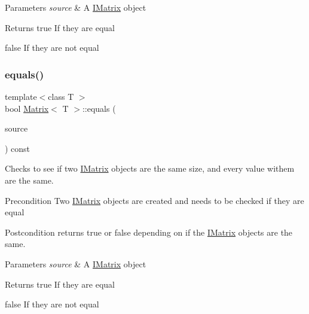 \begin{DoxyParams}{Parameters}
{\em source} & A \mbox{\hyperlink{class_i_matrix}{I\+Matrix}} object \\
\hline
\end{DoxyParams}
\begin{DoxyReturn}{Returns}
true If they are equal 

false If they are not equal 
\end{DoxyReturn}
\mbox{\label{class_matrix_a7fd4b8c603866c4cb516ddfe615373b0}} 
\subsubsection{\texorpdfstring{equals()}{equals()}\hspace{0.1cm}{\footnotesize\ttfamily [6/6]}}
{\footnotesize\ttfamily template$<$class T $>$ \\
bool \mbox{\hyperlink{class_matrix}{Matrix}}$<$ T $>$\+::equals (\begin{DoxyParamCaption}\item[{const \mbox{\hyperlink{class_i_matrix}{I\+Matrix}}$<$ \mbox{\hyperlink{class_d_matrix}{D\+Matrix}}$<$ T $>$, T $>$ \&}]{source }\end{DoxyParamCaption}) const}



Checks to see if two \mbox{\hyperlink{class_i_matrix}{I\+Matrix}} objects are the same size, and every value withem are the same. 

\begin{DoxyPrecond}{Precondition}
Two \mbox{\hyperlink{class_i_matrix}{I\+Matrix}} objects are created and needs to be checked if they are equal 
\end{DoxyPrecond}
\begin{DoxyPostcond}{Postcondition}
returns true or false depending on if the \mbox{\hyperlink{class_i_matrix}{I\+Matrix}} objects are the same.
\end{DoxyPostcond}

\begin{DoxyParams}{Parameters}
{\em source} & A \mbox{\hyperlink{class_i_matrix}{I\+Matrix}} object \\
\hline
\end{DoxyParams}
\begin{DoxyReturn}{Returns}
true If they are equal 

false If they are not equal 
\end{DoxyReturn}
\mbox{\label{class_matrix_ada60917bb197292e0645992e108c2c2f}} 
